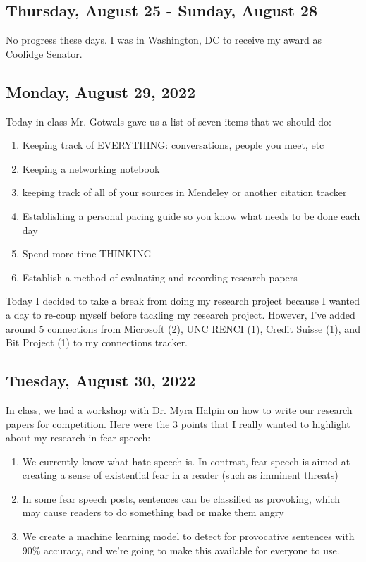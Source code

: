 \documentclass[11pt,letterpaper]{article}
\begin{document}
\subsection{Thursday, August 25 - Sunday, August 28}
No progress these days. I was in Washington, DC to receive my award as Coolidge Senator.

\subsection{Monday, August 29, 2022}
Today in class Mr. Gotwals gave us a list of seven items that we should do:
\begin{enumerate}
    \item Keeping track of EVERYTHING: conversations, people you meet, etc
    \item Keeping a networking notebook 
    \item keeping track of all of your sources in Mendeley or another citation tracker
    \item Establishing a personal pacing guide so you know what needs to be done each day
    \item Spend more time THINKING
    \item Establish a method of evaluating and recording research papers
\end{enumerate}

Today I decided to take a break from doing my research project because I wanted a day to re-coup myself before tackling my research project. However, I've added around 5 connections from Microsoft (2), UNC RENCI (1), Credit Suisse (1), and Bit Project (1) to my connections tracker.

\subsection{Tuesday, August 30, 2022}
In class, we had a workshop with Dr. Myra Halpin on how to write our research papers for competition. Here were the 3 points that I really wanted to highlight about my research in fear speech:
\begin{enumerate}
    \item We currently know what hate speech is. In contrast, fear speech is aimed at creating a sense of existential fear in a reader (such as imminent threats)

    \item In some fear speech posts, sentences can be classified as provoking, which may cause readers to do something bad or make them angry

    \item We create a machine learning model to detect for provocative sentences with 90\% accuracy, and we’re going to make this available for everyone to use.
\end{enumerate}
\end{document}
